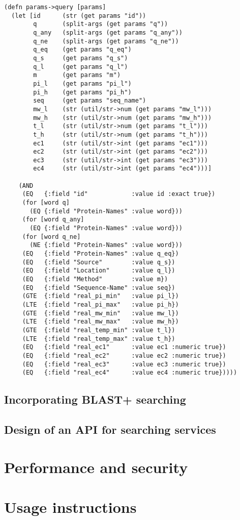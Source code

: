 \lstset{language=Lisp}
\begin{lstlisting}
(defn params->query [params]
  (let [id      (str (get params "id"))
        q       (split-args (get params "q"))
        q_any   (split-args (get params "q_any"))
        q_ne    (split-args (get params "q_ne"))
        q_eq    (get params "q_eq")
        q_s     (get params "q_s")
        q_l     (get params "q_l")
        m       (get params "m")
        pi_l    (get params "pi_l")
        pi_h    (get params "pi_h")
        seq     (get params "seq_name")
        mw_l    (str (util/str->num (get params "mw_l")))
        mw_h    (str (util/str->num (get params "mw_h")))
        t_l     (str (util/str->num (get params "t_l")))
        t_h     (str (util/str->num (get params "t_h")))
        ec1     (str (util/str->int (get params "ec1")))
        ec2     (str (util/str->int (get params "ec2")))
        ec3     (str (util/str->int (get params "ec3")))
        ec4     (str (util/str->int (get params "ec4")))]

    (AND
     (EQ   {:field "id"            :value id :exact true})
     (for [word q]
       (EQ {:field "Protein-Names" :value word}))
     (for [word q_any]
       (EQ {:field "Protein-Names" :value word}))
     (for [word q_ne]
       (NE {:field "Protein-Names" :value word}))
     (EQ   {:field "Protein-Names" :value q_eq})
     (EQ   {:field "Source"        :value q_s})
     (EQ   {:field "Location"      :value q_l})
     (EQ   {:field "Method"        :value m})
     (EQ   {:field "Sequence-Name" :value seq})
     (GTE  {:field "real_pi_min"   :value pi_l})
     (LTE  {:field "real_pi_max"   :value pi_h})
     (GTE  {:field "real_mw_min"   :value mw_l})
     (LTE  {:field "real_mw_max"   :value mw_h})
     (GTE  {:field "real_temp_min" :value t_l})
     (LTE  {:field "real_temp_max" :value t_h})
     (EQ   {:field "real_ec1"      :value ec1 :numeric true})
     (EQ   {:field "real_ec2"      :value ec2 :numeric true})
     (EQ   {:field "real_ec3"      :value ec3 :numeric true})
     (EQ   {:field "real_ec4"      :value ec4 :numeric true}))))
\end{lstlisting}


\subsection{Incorporating BLAST+ searching}

\subsection{Design of an API for searching services}


\section{Performance and security}

\section{Usage instructions}
